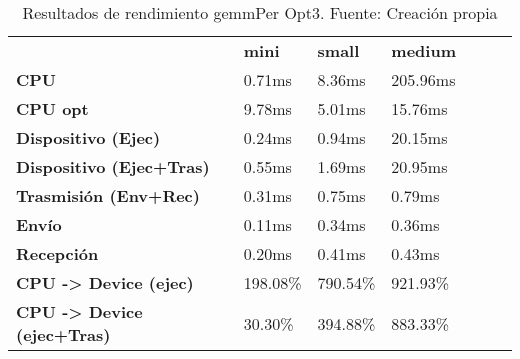 \begin{table}[H]
    \centering
    \begin{tabular}{lllllll}
    \rowcolor[HTML]{DAE8FC} \ &  \textbf{mini} &  \textbf{	small} &  \textbf{	medium} \\
    \cellcolor[HTML]{DAE8FC} \textbf{CPU} & 0.71ms & 	8.36ms & 	205.96ms \\
    \rowcolor[HTML]{EFEFEF} \cellcolor[HTML]{DAE8FC} \textbf{CPU opt} & 9.78ms & 	5.01ms & 	15.76ms \\
    \cellcolor[HTML]{DAE8FC} \textbf{Dispositivo (Ejec)} & 0.24ms & 	0.94ms & 	20.15ms \\
    \rowcolor[HTML]{EFEFEF} \cellcolor[HTML]{DAE8FC} \textbf{Dispositivo (Ejec+Tras)} & 0.55ms & 	1.69ms & 	20.95ms \\
    \cellcolor[HTML]{DAE8FC} \textbf{Trasmisión (Env+Rec)} & 0.31ms & 	0.75ms & 	0.79ms \\
    \rowcolor[HTML]{EFEFEF} \cellcolor[HTML]{DAE8FC} \textbf{Envío} & 0.11ms & 	0.34ms & 	0.36ms \\
    \cellcolor[HTML]{DAE8FC} \textbf{Recepción} & 0.20ms & 	0.41ms & 	0.43ms \\
    \rowcolor[HTML]{EFEFEF} \cellcolor[HTML]{DAE8FC} \textbf{CPU -> Device (ejec)} & 198.08\% & 	790.54\% & 	921.93\% \\
    \cellcolor[HTML]{DAE8FC} \textbf{CPU -> Device (ejec+Tras)} & 30.30\% & 	394.88\% & 	883.33\% \\
    \end{tabular}
    \caption[Resultados de rendimiento gemmPer Opt3]{{Resultados de rendimiento gemmPer Opt3. Fuente: Creación propia}}
    \label{table_test_gemmPer_Opt3_hw_performanceResults}
\end{table}